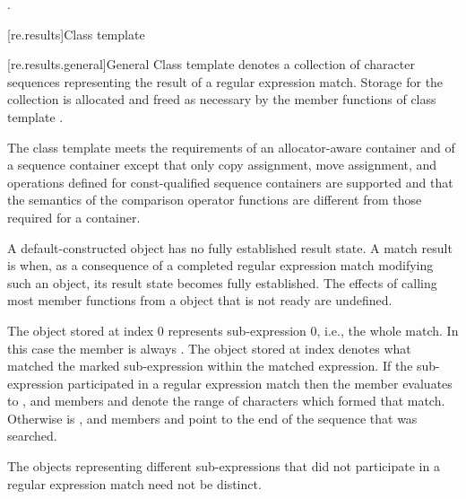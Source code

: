 \begin{itemdescr}
\pnum
\returns
{}.
\end{itemdescr}

[re.results]{Class template }

[re.results.general]{General}
\pnum
{}%
Class template  denotes a collection of character
sequences representing the result of a regular expression
match. Storage for the collection is allocated and freed as necessary
by the member functions of class template .

\pnum
{}%
%
The class template  meets the requirements of an
allocator-aware container and of
a sequence container
except that only
copy assignment,
move assignment, and
operations defined for const-qualified sequence containers
are supported and
that the semantics of the comparison operator functions are different from those
required for a container.

\pnum
A default-constructed  object has no fully established result state. A
match result is  when, as a consequence of a completed regular expression match
modifying such an object, its result state becomes fully established. The effects of calling
most member functions from a  object that is not ready are undefined.

\pnum
{}%
The  object stored at index 0 represents sub-expression 0,
i.e., the whole match. In this case the  member
 is always . The 
object stored at index  denotes what matched the marked
sub-expression  within the matched expression. If the
sub-expression  participated in a regular expression
match then the  member  evaluates to , and
members  and  denote the range of characters
 which formed that
match. Otherwise  is , and members 
and  point to the end of the sequence
that was searched.
\begin{note}
The  objects representing
different sub-expressions that did not participate in a regular expression
match need not be distinct.
\end{note}

